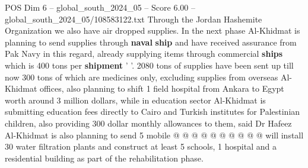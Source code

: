 \begin{textsample}{POS Dim 6 – global\_south\_2024\_05 – Score 6.00 – global\_south\_2024\_05/108583122.txt}
Through the Jordan Hashemite Organization we also have air dropped supplies.
In the next phase Al-Khidmat is planning to send supplies through \textbf{naval} \textbf{ship} and have received assurance from Pak Navy in this regard, already supplying items through commercial \textbf{ships} which is 400 tons per \textbf{shipment} ' '. 2080 tons of supplies have been sent up till now 300 tons of which are medicines only, excluding supplies from overseas Al-Khidmat offices, also planning to shift 1 field hospital from Ankara to Egypt worth around 3 million dollars, while in education sector Al-Khidmat is submitting education fees directly to Cairo and Turkish institutes for Palestinian children, also providing 300 dollar monthly allowances to them, said Dr Hafeez Al-Khidmat is also planning to send 5 mobile @ @ @ @ @ @ @ @ @ @ will install 30 water filtration plants and construct at least 5 schools, 1 hospital and a residential building as part of the rehabilitation phase.

\end{textsample}
